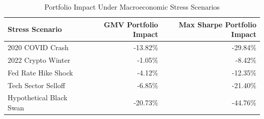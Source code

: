 \begin{table}[H]
\centering
\caption{\label{tab:stress_summary}Portfolio Impact Under Macroeconomic Stress Scenarios}
\fontsize{9}{11}\selectfont
\begin{tabular}[t]{lrr}
\toprule
Stress Scenario & GMV Portfolio Impact & Max Sharpe Portfolio Impact\\
\midrule
2020 COVID Crash & -13.82\% & -29.84\%\\
2022 Crypto Winter & -1.05\% & -8.42\%\\
Fed Rate Hike Shock & -4.12\% & -12.35\%\\
Tech Sector Selloff & -6.85\% & -21.40\%\\
Hypothetical Black Swan & -20.73\% & -44.76\%\\
\bottomrule
\end{tabular}
\end{table}
